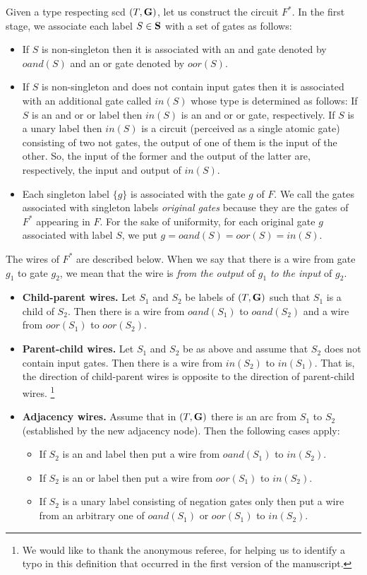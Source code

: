 \documentclass{llncs}
\begin{document}
Given a type respecting {\sc scd} $(T,{\bf G})$, let us construct the circuit $F^*$. 
In the first stage, we associate each label $S \in {\bf S}$ with a set of gates as follows:
\begin{itemize}
\item If $S$ is non-singleton then it is associated with an {\sc and} gate denoted by $oand(S)$
and an {\sc or} gate denoted by $oor(S)$.
\item If $S$ is non-singleton and does not contain input gates then it is associated with an additional
gate called $in(S)$ whose type is determined as follows: If $S$ is an {\sc and} or {\sc or} label
then $in(S)$ is  an {\sc and} or {\sc or} gate, respectively. If $S$ is a unary label then
$in(S)$ is a circuit (perceived as a single atomic gate) consisting of two {\sc not} gates, the output of
one of them is the input of the other. So, the input of the former and the output of the latter are,
respectively, the input and output of $in(S)$.
\item Each singleton label $\{g\}$ is associated with the gate $g$
of $F$. We call the gates associated with singleton labels \emph{original gates} because
they are the gates of $F^*$ appearing in $F$. For the sake of uniformity,
for each original gate $g$ associated with label $S$, we put $g=oand(S)=oor(S)=in(S)$.
\end{itemize}

The wires of $F^*$ are described below. When we say that
there is a wire from gate $g_1$ to gate $g_2$, we mean that the wire is
\emph{from the output} of $g_1$ \emph{to the input} of $g_2$.
\begin{itemize}
\item {\bf Child-parent wires.}
Let $S_1$ and $S_2$ be labels of $(T,{\bf G})$ such that
$S_1$ is a child of $S_2$. Then there is a wire from $oand(S_1)$ to $oand(S_2)$ and a wire from $oor(S_1)$ to $oor(S_2)$.
\item {\bf Parent-child wires.}
Let $S_1$ and $S_2$ be as above and assume that $S_2$ does not contain input gates.
Then there is a wire from $in(S_2)$ to $in(S_1)$. That is, the direction of child-parent wires
is opposite to the direction of parent-child wires. \footnote{We would like to thank the anonymous
referee, for helping us to identify a typo in this definition that occurred in the first version of
the manuscript.}
\item {\bf Adjacency wires.} Assume that in $(T,{\bf G})$ there is an arc from $S_1$ to $S_2$ (established by the new adjacency node). Then the following cases apply:
\begin{itemize}
\item If $S_2$ is an {\sc and} label then put a wire from $oand(S_1)$ to $in(S_2)$.
\item If $S_2$ is an {\sc or} label then put a wire from $oor(S_1)$ to $in(S_2)$.
\item If $S_2$ is a unary label consisting of negation gates only then put a wire from
an arbitrary one of $oand(S_1)$ or $oor(S_1)$ to $in(S_2)$.
\end{itemize}
\end{itemize}
 
\end{document}
